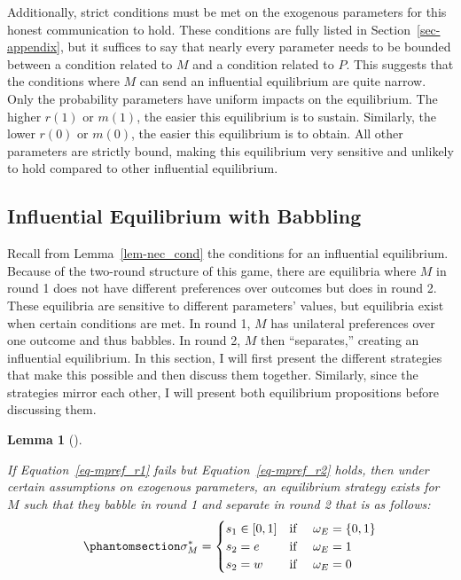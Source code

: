 \documentclass[
  12pt,
]{article}
\theoremstyle{plain}
\newtheorem{lemma}{Lemma}[section]
\theoremstyle{plain}
\theoremstyle{remark}
\begin{document}
Additionally, strict conditions must be met on the exogenous parameters
for this honest communication to hold. These conditions are fully listed
in Section~\ref{sec-appendix}, but it suffices to say that nearly every
parameter needs to be bounded between a condition related to \(M\) and a
condition related to \(P\). This suggests that the conditions where
\(M\) can send an influential equilibrium are quite narrow. Only the
probability parameters have uniform impacts on the equilibrium. The
higher \(r(1)\) or \(m(1)\), the easier this equilibrium is to sustain.
Similarly, the lower \(r(0)\) or \(m(0)\), the easier this equilibrium
is to obtain. All other parameters are strictly bound, making this
equilibrium very sensitive and unlikely to hold compared to other
influential equilibrium.

\subsection{Influential Equilibrium with
Babbling}\label{influential-equilibrium-with-babbling}

Recall from Lemma~\ref{lem-nec_cond} the conditions for an influential
equilibrium. Because of the two-round structure of this game, there are
equilibria where \(M\) in round 1 does not have different preferences
over outcomes but does in round 2. These equilibria are sensitive to
different parameters' values, but equilibria exist when certain
conditions are met. In round 1, \(M\) has unilateral preferences over
one outcome and thus babbles. In round 2, \(M\) then ``separates,''
creating an influential equilibrium. In this section, I will first
present the different strategies that make this possible and then
discuss them together. Similarly, since the strategies mirror each
other, I will present both equilibrium propositions before discussing
them.

\begin{lemma}[]\protect\hypertarget{lem-etow}{}\label{lem-etow}

If Equation~\ref{eq-mpref_r1} fails but Equation~\ref{eq-mpref_r2}
holds, then under certain assumptions on exogenous parameters, an
equilibrium strategy exists for \(M\) such that they babble in round 1
and separate in round 2 that is as follows:
\begin{equation}\phantomsection\label{eq-stratm_e_sep}{
\sigma^{*}_M = 
\begin{cases}
s_1 \in [0, 1] & \text{if } \quad \omega_E = \{0, 1\} \\
s_2 = e  & \text{if } \quad \omega_E = 1\\
s_2 = w  & \text{if } \quad \omega_E = 0\\
\end{cases}
}\end{equation}

\end{lemma}
\end{document}
